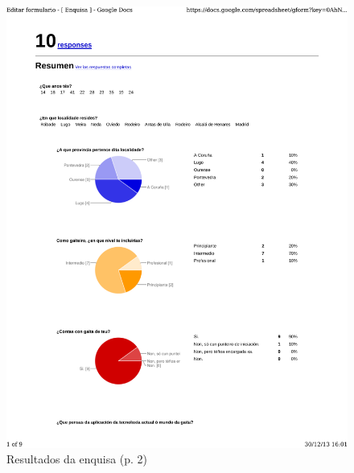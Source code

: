 \begin{figure}
 \centering
 \includegraphics[scale=0.7,page=2,keepaspectratio=true]{./imagenes/enquisa.pdf}
 \caption{Resultados da enquisa (p. 2)}
 \label{figura:ResultadosEnquisa2}
\end{figure}

